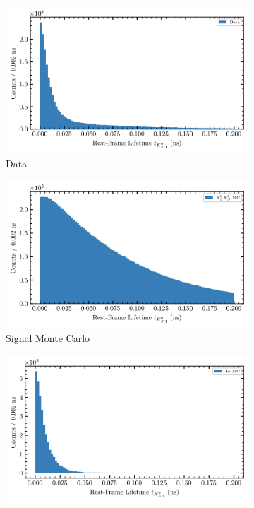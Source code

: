 \begin{figure}
  \begin{center}
    \begin{subfigure}{.8\columnwidth}
      \includegraphics[width=\linewidth]{figures/rfl_data_chisqdof_3.4.png}
      \caption{Data}
      \label{fig:rfl-data}
    \end{subfigure}
    \begin{subfigure}{.45\columnwidth}
      \includegraphics[width=\linewidth]{figures/rfl_accmc_chisqdof_3.4.png}
      \caption{Signal Monte Carlo}
      \label{fig:rfl-accmc}
    \end{subfigure}
    \begin{subfigure}{.45\columnwidth}
      \includegraphics[width=\linewidth]{figures/rfl_bkgmc_chisqdof_3.4.png}

\end{subfigure}
\end{center}
\end{figure}
